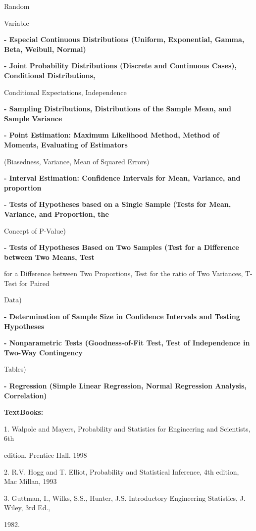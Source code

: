 \documentclass[12pt,a4paper]{article}
\begin{document}
Random\par
Variable\par
\vspace{2pt}\textbf{- Especial Continuous Distributions (Uniform, Exponential, Gamma, Beta, Weibull, Normal)}\par
\vspace{2pt}\textbf{- Joint Probability Distributions (Discrete and Continuous Cases), Conditional Distributions,}\par
Conditional Expectations, Independence\par
\vspace{2pt}\textbf{- Sampling Distributions, Distributions of the Sample Mean, and Sample Variance}\par
\vspace{2pt}\textbf{- Point Estimation: Maximum Likelihood Method, Method of Moments, Evaluating of Estimators}\par
(Biasedness, Variance, Mean of Squared Errors)\par
\vspace{2pt}\textbf{- Interval Estimation: Confidence Intervals for Mean, Variance, and proportion}\par
\vspace{2pt}\textbf{- Tests of Hypotheses based on a Single Sample (Tests for Mean, Variance, and Proportion, the}\par
Concept of P-Value)\par
\vspace{2pt}\textbf{- Tests of Hypotheses Based on Two Samples (Test for a Difference between Two Means, Test}\par
for a Difference between Two Proportions, Test for the ratio of Two Variances, T-Test for Paired\par
Data)\par
\vspace{2pt}\textbf{- Determination of Sample Size in Confidence Intervals and Testing Hypotheses}\par
\vspace{2pt}\textbf{- Nonparametric Tests (Goodness-of-Fit Test, Test of Independence in Two-Way Contingency}\par
Tables)\par
\vspace{2pt}\textbf{- Regression (Simple Linear Regression, Normal Regression Analysis, Correlation)}\par\vspace{4pt}
\textbf{TextBooks:}\par\vspace{2pt}
1. Walpole and Mayers, Probability and Statistics for Engineering and Scientists, 6th\par
edition, Prentice Hall. 1998\par
2. R.V. Hogg and T. Elliot, Probability and Statistical Inference, 4th edition, Mac Millan, 1993\par
3. Guttman, I., Wilks, S.S., Hunter, J.S. Introductory Engineering Statistics, J. Wiley, 3rd Ed.,\par
1982.\par
\vspace{4pt}
\end{document}
